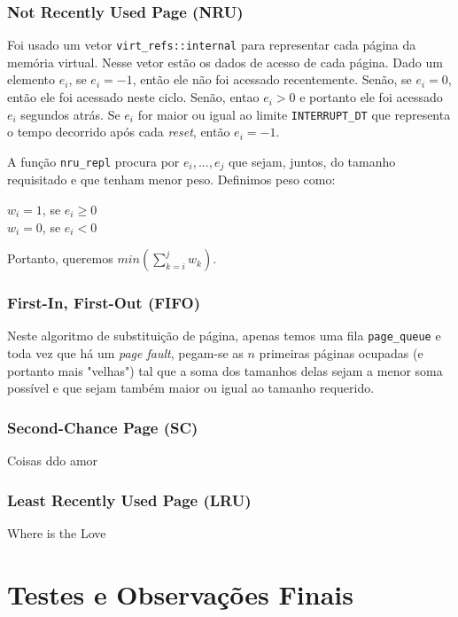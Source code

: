 \documentclass{beamer}
\begin{document}

\begin{frame}
  \frametitle{Not Recently Used Page (NRU)}
  Foi usado um vetor \texttt{virt\_refs::internal} para representar cada página da memória virtual.
  Nesse vetor estão os dados de acesso de cada página. Dado um elemento $e_i$, se $e_i=-1$, então
  ele não foi acessado recentemente. Senão, se $e_i=0$, então ele foi acessado neste ciclo. Senão,
  entao $e_i>0$ e portanto ele foi acessado $e_i$ segundos atrás. Se $e_i$ for maior ou igual ao
  limite \texttt{INTERRUPT\_DT} que representa o tempo decorrido após cada \textit{reset}, então
  $e_i=-1$.

  A função \texttt{nru\_repl} procura por $e_i,...,e_j$ que sejam, juntos, do tamanho requisitado e
  que tenham menor peso. Definimos peso como:

  $w_i = 1$, se $e_i \geq 0$ \\
  $w_i = 0$, se $e_i < 0$

  Portanto, queremos $min(\sum_{k=i}^j w_k)$.
\end{frame}


\begin{frame}
  \frametitle{First-In, First-Out (FIFO)}
  Neste algoritmo de substituição de página, apenas temos uma fila \texttt{page\_queue} e toda vez
  que há um \textit{page fault}, pegam-se as $n$ primeiras páginas ocupadas (e portanto mais
  "velhas") tal que a soma dos tamanhos delas sejam a menor soma possível e que sejam também maior
  ou igual ao tamanho requerido.
\end{frame}


\begin{frame}
\frametitle{Second-Chance Page (SC)}
Coisas ddo amor
\end{frame}


\begin{frame}
\frametitle{Least Recently Used Page (LRU)}
Where is the Love
\end{frame}

\section{Testes e Observações Finais}
\end{document}
